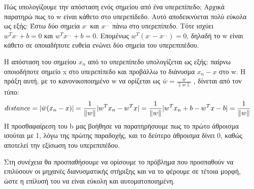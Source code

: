 \documentclass{article}
\DeclarePairedDelimiter\abs{\lvert}{\rvert}%
\newcommand{\norm}[1]{\left\lVert#1\right\rVert}
\begin{document}
 Πώς υπολογίζουμε την απόσταση ενός σημείου από ένα υπερεπίπεδο;
Αρχικά παρατηρώ πως το w είναι κάθετο στο υπερεπίδεδο. Αυτό αποδεικνύεται πολύ εύκολα ως εξής: Έστω δύο σημεία $x^,$ και $x^{,,}$ πάνω στο υπερεπίπεδο. Τότε ισχύει $w^T  x^, + b = 0$ και $w^T  x^{,,} + b = 0$. Επομένως $w^T (x^, -  x^{,,}) = 0$, δηλαδή το w είναι κάθετο σε οποιαδήποτε ευθεία ενώνει δύο σημεία του υπερεπιπέδου.

 Η απόσταση του σημείου $x_n$ από το υπερεπίπεδο υπολογίζεται ως εξής: παίρνω οποιοδήποτε σημείο x στο υπερεπίπεδο και προβάλλω το διάνυσμα $x_n - x$ στο w. Η πράξη αυτή, με το κανονικοποιημένο w να ορίζεται ως $\bar{w}=\frac{w}{\norm{w}}$ , δίνεται από τον τύπο:
$$
distance=\abs{\bar{w} (x_n -x)} =\frac{1}{\norm{w}} \abs{w^T x_n - w^T x}
=\frac{1}{\norm{w}} \abs{w^T x_n  +b - w^T x -b}=\frac{1}{\norm{w}} \\
$$ 
Η προσθαφαίρεση του b μας βοήθησε να παρατηρήσουμε πως το πρώτο άθροισμα ισούται με 1, λόγω της πρώτης παραδοχής, και το δεύτερο άθροισμα δίνει 0, καθώς αποτελεί την εξίσωση του υπερεπιπέδου.

Στη συνέχεια θα προσπαθήσουμε να ορίσουμε το πρόβλημα που προσπαθούν να επιλύσουν οι μηχανές διανυσματικής στήριξης και να το φέρουμε σε τέτοια μορφή, ώστε η επίλυσή του να είναι εύκολη και αυτοματοποιημένη.
\end{document}
